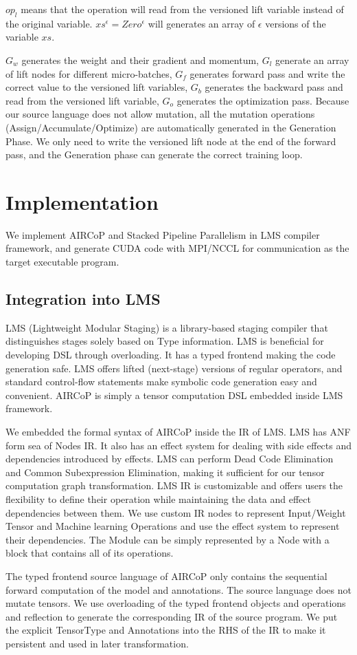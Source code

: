 \documentclass[sigplan, nonacm]{acmart}\settopmatter{printfolios=true,printccs=false,printacmref=false}
\begin{document}
$op_l$ means that the operation will read from the versioned lift variable instead of the original variable. $xs^\epsilon = Zero^\epsilon$ will generates an array of $\epsilon$ versions of the variable $xs$.\par
$G_w$ generates the weight and their gradient and momentum, $G_l$ generate an array of lift nodes for different micro-batches, $G_f$ generates forward pass and write the correct value to the versioned lift variables, $G_b$ generates the backward pass and read from the versioned lift variable, $G_o$ generates the optimization pass. Because our source language does not allow mutation, all the mutation operations (Assign/Accumulate/Optimize) are automatically generated in the Generation Phase. We only need to write the versioned lift node at the end of the forward pass, and the Generation phase can generate the correct training loop.
\section{Implementation} \label{implementation}
We implement AIRCoP and Stacked Pipeline Parallelism in LMS compiler framework\cite{rompf2010lightweight}, and generate CUDA\cite{sanders2010cuda} code with MPI\cite{gropp1999using}/NCCL for communication as the target executable program.\par
\subsection{Integration into LMS}
 LMS (Lightweight Modular Staging) is a library-based staging compiler that distinguishes stages solely based on Type information. LMS is beneficial for developing DSL through overloading. It has a typed frontend making the code generation safe. LMS offers lifted (next-stage) versions of regular operators, and standard control-flow statements make symbolic code generation easy and convenient. AIRCoP is simply a tensor computation DSL embedded inside LMS framework.\par
We embedded the formal syntax of AIRCoP inside the IR of LMS. LMS has ANF\cite{flanagan1993essence} form sea of Nodes\cite{click1995simple} IR. It also has an effect system for dealing with side effects and dependencies introduced by effects. LMS can perform Dead Code Elimination and Common Subexpression Elimination, making it sufficient for our tensor computation graph transformation. LMS IR is customizable and offers users the flexibility to define their operation while maintaining the data and effect dependencies between them. We use custom IR nodes to represent Input/Weight Tensor and Machine learning Operations and use the effect system to represent their dependencies. The Module can be simply represented by a Node with a block that contains all of its operations. \par
The typed frontend source language of AIRCoP only contains the sequential forward computation of the model and annotations. The source language does not mutate tensors. We use overloading of the typed frontend objects and operations and reflection to generate the corresponding IR of the source program. We put the explicit TensorType and Annotations into the RHS of the IR to make it persistent and used in later transformation. \par
\end{document}
